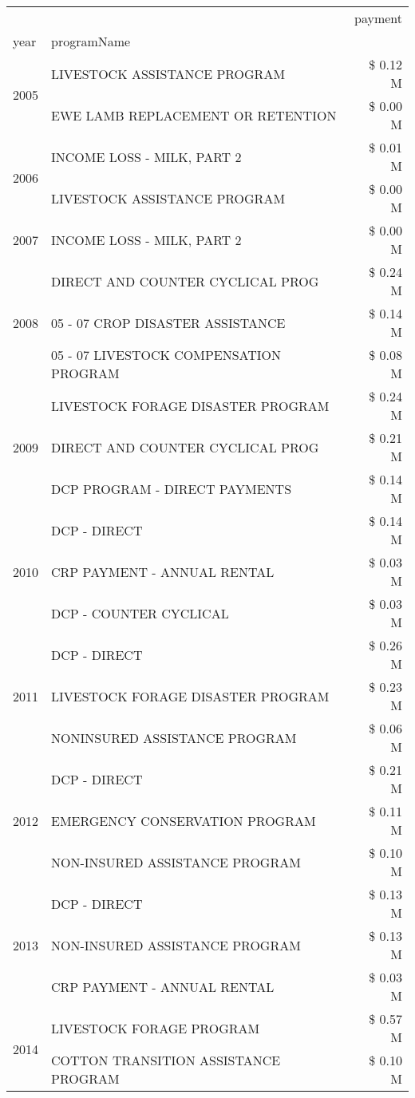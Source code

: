 \begin{tabular}{llr}
\toprule
 &  & payment \\
year & programName &  \\
\midrule
\multirow[t]{2}{*}{2005} & LIVESTOCK ASSISTANCE PROGRAM & \$ 0.12 M \\
 & EWE LAMB REPLACEMENT OR RETENTION & \$ 0.00 M \\
\cline{1-3}
\multirow[t]{2}{*}{2006} & INCOME LOSS - MILK, PART 2 & \$ 0.01 M \\
 & LIVESTOCK ASSISTANCE PROGRAM & \$ 0.00 M \\
\cline{1-3}
2007 & INCOME LOSS - MILK, PART 2 & \$ 0.00 M \\
\cline{1-3}
\multirow[t]{3}{*}{2008} & DIRECT AND COUNTER CYCLICAL PROG & \$ 0.24 M \\
 & 05 - 07 CROP DISASTER ASSISTANCE & \$ 0.14 M \\
 & 05 - 07 LIVESTOCK COMPENSATION PROGRAM & \$ 0.08 M \\
\cline{1-3}
\multirow[t]{3}{*}{2009} & LIVESTOCK FORAGE DISASTER  PROGRAM & \$ 0.24 M \\
 & DIRECT AND COUNTER CYCLICAL PROG & \$ 0.21 M \\
 & DCP PROGRAM - DIRECT PAYMENTS & \$ 0.14 M \\
\cline{1-3}
\multirow[t]{3}{*}{2010} & DCP - DIRECT & \$ 0.14 M \\
 & CRP PAYMENT - ANNUAL RENTAL & \$ 0.03 M \\
 & DCP - COUNTER CYCLICAL & \$ 0.03 M \\
\cline{1-3}
\multirow[t]{3}{*}{2011} & DCP - DIRECT & \$ 0.26 M \\
 & LIVESTOCK FORAGE DISASTER PROGRAM & \$ 0.23 M \\
 & NONINSURED ASSISTANCE PROGRAM & \$ 0.06 M \\
\cline{1-3}
\multirow[t]{3}{*}{2012} & DCP - DIRECT & \$ 0.21 M \\
 & EMERGENCY CONSERVATION PROGRAM & \$ 0.11 M \\
 & NON-INSURED ASSISTANCE PROGRAM & \$ 0.10 M \\
\cline{1-3}
\multirow[t]{3}{*}{2013} & DCP - DIRECT & \$ 0.13 M \\
 & NON-INSURED ASSISTANCE PROGRAM & \$ 0.13 M \\
 & CRP PAYMENT - ANNUAL RENTAL & \$ 0.03 M \\
\cline{1-3}
\multirow[t]{3}{*}{2014} & LIVESTOCK FORAGE PROGRAM & \$ 0.57 M \\
 & COTTON TRANSITION ASSISTANCE PROGRAM & \$ 0.10 M \\

\end{tabular}
